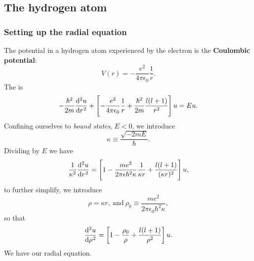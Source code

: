 \subsection{The hydrogen atom}
\label{subsec_hyd}
\subsubsection{Setting up the radial equation}
\label{sec_settingrad}
The potential in a hydrogen atom experienced by the electron is the \textbf{Coulombic potential}: 
\begin{equation}
V(r)=-\frac{e^2}{4\pi\epsilon_0}\frac{1}{r}.
\end{equation}
The \sch is
\begin{equation}
\label{hyd_sch}
-\frac{\hbar^2}{2m}\diff[2] ur+\lf[-\frac{e^2}{4\pi\epsilon_0}\frac{1}{r}+\frac{\hbar^2}{2m}\frac{l(l+1)}{r^2} \rt]u=Eu.
\end{equation}
Confining ourselves to \textit{bound states}, \ie $E<0$, we introduce 
\begin{equation}
\kappa\equiv\frac{\sqrt{-2mE}}{\hbar}. 
\end{equation}
Dividing  by $E$ we have
\begin{equation}
\frac{1}{\kappa^2}\diff[2]ur=\lf[1-\frac{me^2}{2\pi\epsilon\hbar^2\kappa}\frac{1}{\kappa r}+\frac{l(l+1)}{(\kappa r)^2} \rt]u, 
\end{equation}
to further simplify, we introduce
\begin{equation}
\rho=\kappa r,\ \text{and}\ \rho_0\equiv\frac{me^2}{2\pi\epsilon_0\hbar^2\kappa}, 
\end{equation}
so that
\begin{equation}
\label{radialeq}
\diff[2]u\rho=\lf[1-\frac{\rho_0}{\rho}+\frac{l(l+1)}{\rho^2} \rt]u.
\end{equation}
We have our radial equation. 
